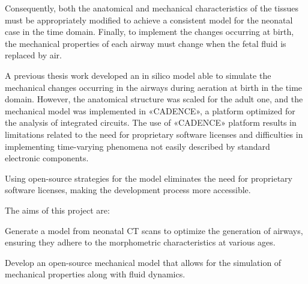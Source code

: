 Consequently, both the anatomical and mechanical characteristics of
the tissues must be appropriately modified to achieve a consistent
model for the neonatal case in the time domain.  Finally, to implement
the changes occurring at birth, the mechanical properties of each
airway must change when the fetal fluid is replaced by air.

A previous thesis work developed an in silico model able to simulate
the mechanical changes occurring in the airways during aeration at
birth in the time domain. However, the anatomical structure was scaled
for the adult one, and the mechanical model was implemented in
«CADENCE», a platform optimized for the analysis of integrated
circuits. The use of «CADENCE» platform results in limitations related
to the need for proprietary software licenses and difficulties in
implementing time-varying phenomena not easily described by standard
electronic components.

Using open-source strategies for the model eliminates the need for
proprietary software licenses, making the development process more
accessible\cite{mani2020}.


The aims of this project are:
\begin{description}
\item Generate a model from neonatal CT scans to optimize the
  generation of airways, ensuring they adhere to the morphometric
  characteristics at various ages.
\item Develop an open-source mechanical model that allows for the
  simulation of mechanical properties along with fluid dynamics.
\end{description}

